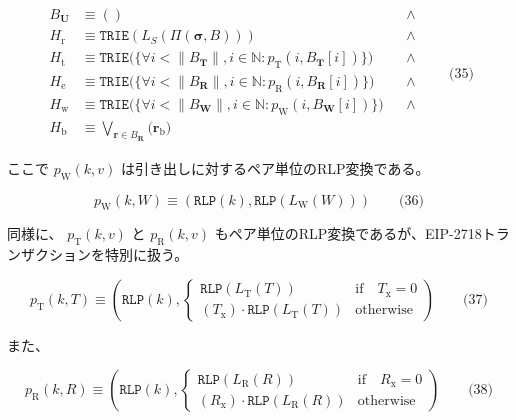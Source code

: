 \documentclass[
]{ltjsarticle}
\begin{document}
\protect\hypertarget{eq-35}{}{}\protect\hypertarget{Receipts_Root_H__e}{}{}

\[\begin{aligned}
B_{\mathbf{U}} &\equiv () && \wedge \\
H_{\mathrm{r}} &\equiv \mathtt{TRIE}(L_S(\Pi(\boldsymbol{\sigma}, B))) && \wedge \\
H_{\mathrm{t}} &\equiv \mathtt{TRIE}\big(\{\forall i < \lVert B_{\mathbf{T}} \rVert,
  i \in \mathbb{N}: p_{\mathrm{T}}(i, B_{\mathbf{T}}[i])\}\big) && \wedge \\
H_{\mathrm{e}} &\equiv \mathtt{TRIE}\big(\{\forall i < \lVert B_{\mathbf{R}} \rVert,
  i \in \mathbb{N}: p_{\mathrm{R}}(i, B_{\mathbf{R}}[i])\}\big) && \wedge \\
H_{\mathrm{w}} &\equiv \mathtt{TRIE}\big(\{\forall i < \lVert B_{\mathbf{W}} \rVert,
  i \in \mathbb{N}: p_{\mathrm{W}}(i, B_{\mathbf{W}}[i])\}\big) && \wedge \\
H_{\mathrm{b}} &\equiv \bigvee_{\mathbf{r} \in B_{\mathbf{R}}} \big(\mathbf{r}_{\mathrm{b}}\big)
\end{aligned} \qquad \text{(35)}\]

ここで \(p_{\mathrm{W}}(k, v)\)
は引き出しに対するペア単位のRLP変換である。

\protect\hypertarget{eq-36}{}{}

\[p_{\mathrm{W}}(k, W) \equiv \left( \mathtt{RLP}(k), \mathtt{RLP}(L_{\mathrm{W}}(W)) \right) \qquad \text{(36)}\]

同様に、 \(p_{\mathrm{T}}(k, v)\) と \(p_{\mathrm{R}}(k, v)\)
もペア単位のRLP変換であるが、EIP-2718トランザクションを特別に扱う。

\protect\hypertarget{eq-37}{}{}

\[p_{\mathrm{T}}(k, T) \equiv \left( \mathtt{RLP}(k), \begin{cases}
\mathtt{RLP}(L_{\mathrm{T}}(T)) & \text{if} \quad T_{\mathrm{x}} = 0 \\
(T_{\mathrm{x}}) \cdot \mathtt{RLP}(L_{\mathrm{T}}(T)) & \text{otherwise}
\end{cases}
\right) \qquad \text{(37)}\]

また、

\protect\hypertarget{eq-38}{}{}

\[p_{\mathrm{R}}(k, R) \equiv \left( \mathtt{RLP}(k), \begin{cases}
\mathtt{RLP}(L_{\mathrm{R}}(R)) & \text{if} \quad R_{\mathrm{x}} = 0 \\
(R_{\mathrm{x}}) \cdot \mathtt{RLP}(L_{\mathrm{R}}(R)) & \text{otherwise}
\end{cases}
\right) \qquad \text{(38)}\]
\end{document}
